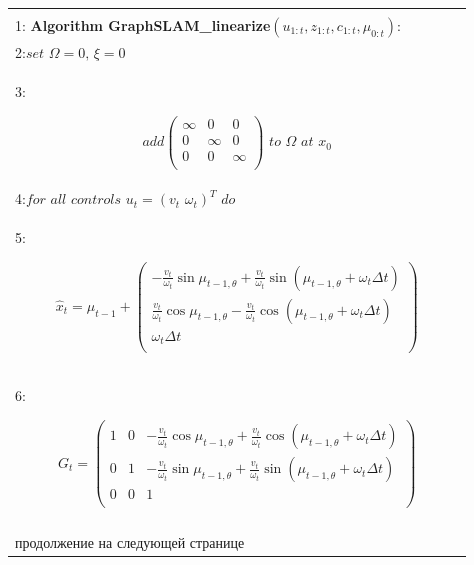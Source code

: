 \documentclass[10pt,a4paper]{article}
\begin{document}
\begin{table}[H]
\begin{center}
\begin{tabular}{|l|}
\hline
{}\\
1:\textbf{ Algorithm GraphSLAM\_linearize}$(u_{1:t},z_{1:t},c_{1:t},\mu_{0:t}):\qquad\qquad$ \\
2:\hspace{5mm}$\textit{set}\,\,\varOmega=0,\,\xi=0$\\
3:\hspace{5mm}
\begin{minipage}{0.2\textwidth}
				\begin{equation*}
\textit{add}	\left(\begin{array}{ccc}
\infty&0&0\\
0&\infty&0\\
0&0&\infty\\
\end{array}\right)
\,\,\textit{to}\,\,\varOmega\,\,\textit{at}\,\,x_0				\end{equation*}
\end{minipage}\\
4:\hspace{5mm}$\textit{for all controls}\,\,u_t=(v_t\,\,\omega_t)^T\,\,\textit{do}$\\
5:\hspace{10mm}
\begin{minipage}{0.2\textwidth}
\begin{equation*}
\hat{x}_t=\mu_{t-1}+
\left(\begin{array}{c}
-\frac{v_t}{\omega_t}\sin\mu_{t-1,\theta}+\frac{v_t}{\omega_t}\sin(\mu_{t-1,\theta}+\omega_t\varDelta t)\\
\frac{v_t}{\omega_t}\cos\mu_{t-1,\theta}-\frac{v_t}{\omega_t}\cos(\mu_{t-1,\theta}+\omega_t\varDelta t)\\
\omega_t\varDelta t\\
\end{array}\right)				\end{equation*}
\end{minipage}\\
6:\hspace{10mm}
\begin{minipage}{0.2\textwidth}
\begin{equation*}
G_t=
\left(\begin{array}{ccc}
				1&0&-\frac{v_t}{\omega_t}\cos\mu_{t-1,\theta}+\frac{v_t}{\omega_t}\cos(\mu_{t-1,\theta}+\omega_t\varDelta t)\\
				0&1&-\frac{v_t}{\omega_t}\sin\mu_{t-1,\theta}+\frac{v_t}{\omega_t}\sin(\mu_{t-1,\theta}+\omega_t\varDelta t)\\
				0&0&1\\
				\end{array}\right)
				\end{equation*}
\end{minipage}\\
{}\\
\hspace{35mm}$\boxed{\textit{продолжение на следующей странице}}$\\


\end{tabular}
\end{center}
\end{table}
\end{document}
